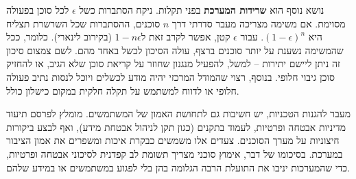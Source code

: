 נושא נוסף הוא \textbf{שרידות המערכת} בפני תקלות. ניקח הסתברות כשל $\epsilon$ לכל סוכן בפעולה מסוימת. אם משימה מצריכה מעבר סדרתי דרך $n$ סוכנים, ההסתברות שכל השרשרת תצליח היא $(1-\epsilon)^n$. עבור $\epsilon$ קטן, אפשר לקרב זאת ל\en{-}$1 - n\epsilon$ (בקירוב לינארי). כלומר, ככל שהמשימה נשענת על יותר סוכנים ברצף, עולה הסיכון לכשל באחד מהם. לשם צמצום סיכון זה ניתן ליישם יתירות – למשל, להפעיל מנגנון שחוזר על קריאת סוכן שלא הגיב, או להחזיק סוכן גיבוי חלופי. בנוסף, רצוי שהמודל המרכזי יהיה מודע לכשלים ויוכל לנסות נתיב פעולה חלופי או לדווח למשתמש על תקלה חלקית במקום כישלון כולל.

מעבר להגנות הטכניות, יש חשיבות גם לתחושת האמון של המשתמשים. מומלץ לפרסם תיעוד מדיניות אבטחה ופרטיות, לעמוד בתקנים (כגון תקן  לניהול אבטחת מידע), ואף לבצע ביקורות חיצוניות על מערך הסוכנים. צעדים אלו משמשים כבקרת איכות ומשפרים את אמון הציבור במערכת. בסיכומו של דבר, אימוץ סוכני  מצריך תשומת לב קפדנית לסיכוני אבטחה ופרטיות, כדי שהמערכות יניבו את התועלת הרבה הגלומה בהן בלי לפגוע במשתמשים או במידע שלהם.
